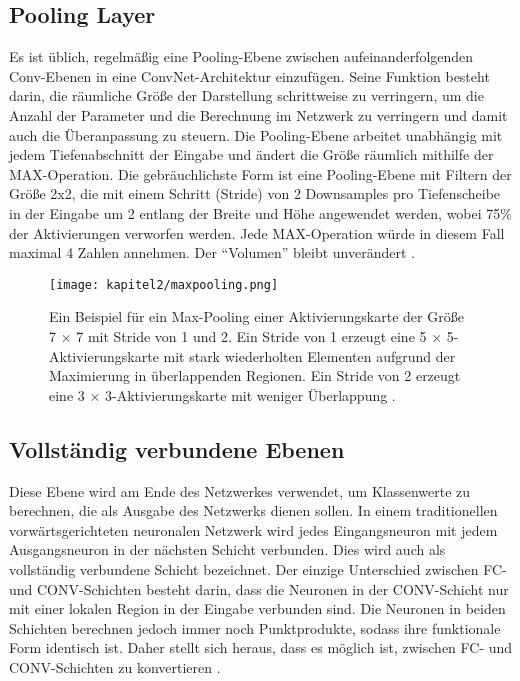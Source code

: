 \subsection{Pooling Layer}
Es ist üblich, regelmäßig eine Pooling-Ebene zwischen aufeinanderfolgenden Conv-Ebenen in eine ConvNet-Architektur einzufügen. Seine Funktion besteht darin, die räumliche Größe der Darstellung schrittweise zu verringern, um die Anzahl der Parameter und die Berechnung im Netzwerk zu verringern und damit auch die Überanpassung zu steuern. Die Pooling-Ebene arbeitet unabhängig mit jedem Tiefenabschnitt der Eingabe und ändert die Größe räumlich mithilfe der MAX-Operation. Die gebräuchlichste Form ist eine Pooling-Ebene mit Filtern der Größe 2x2, die mit einem Schritt (Stride) von 2 Downsamples pro Tiefenscheibe in der Eingabe um 2 entlang der Breite und Höhe angewendet werden, wobei 75\% der Aktivierungen verworfen werden. Jede MAX-Operation würde in diesem Fall maximal 4 Zahlen annehmen. Der \enquote{Volumen} bleibt unverändert \cite*{StanfordUniversityCoursecs231n2018a}.

\begin{figure}[H]
  \centering
  \texttt{[image: kapitel2/maxpooling.png]}
  \caption[Max-Pooling]{Ein Beispiel für ein Max-Pooling einer Aktivierungskarte der Größe 7 × 7 mit Stride von 1 und 2. Ein Stride von 1 erzeugt eine 5 × 5-Aktivierungskarte mit stark wiederholten Elementen aufgrund der Maximierung in überlappenden Regionen. Ein Stride von 2 erzeugt eine 3 × 3-Aktivierungskarte mit weniger Überlappung \cite*[326]{Aggarwal2018}.}
  \label{Kap2:Pooling}
\end{figure}


\subsection{Vollständig verbundene Ebenen}
Diese Ebene wird am Ende des Netzwerkes verwendet, um Klassenwerte zu berechnen, die als Ausgabe des Netzwerks dienen sollen. In einem traditionellen vorwärtsgerichteten neuronalen Netzwerk wird jedes Eingangsneuron mit jedem Ausgangsneuron in der nächsten Schicht verbunden. Dies wird auch als vollständig verbundene Schicht bezeichnet. Der einzige Unterschied zwischen FC- und CONV-Schichten besteht darin, dass die Neuronen in der CONV-Schicht nur mit einer lokalen Region in der Eingabe verbunden sind. Die Neuronen in beiden Schichten berechnen jedoch immer noch Punktprodukte, sodass ihre funktionale Form identisch ist. Daher stellt sich heraus, dass es möglich ist, zwischen FC- und CONV-Schichten zu konvertieren \cite*{StanfordUniversityCoursecs231n2018a}.


